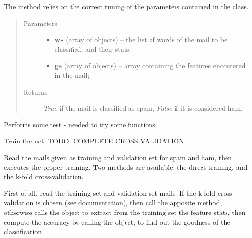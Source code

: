 \documentclass[letterpaper,10pt,english]{sphinxmanual}
\begin{document}
\begin{fulllineitems}
\begin{fulllineitems}
The method relies on the correct tuning of the parameters contained in
the {\hyperref[index:config.Config]{}} class.
\begin{quote}\begin{description}
\item[{Parameters}] \leavevmode\begin{itemize}
\item {} 
\textbf{ws} (array of {\hyperref[index:test_stat.Test_word]{}} objects) -- the list of words of the mail to be classified, and their stats;

\item {} 
\textbf{gs} (array of {\hyperref[index:test_stat.Test_stat]{}} objects) -- array containing the features encontered in the mail;

\end{itemize}

\item[{Returns}] \leavevmode
\emph{True} if the mail is classified as spam, \emph{False} if it is            considered ham.

\end{description}\end{quote}

\end{fulllineitems}


\begin{fulllineitems}
\label{index:naive_bayes.Bayes.test_bayes}
Performs some test - needed to try some functions.

\end{fulllineitems}


\begin{fulllineitems}
\label{index:naive_bayes.Bayes.train}
Train the net. TODO: COMPLETE CROSS-VALIDATION

Read the mails given as training and validation set for spam and ham,
then executes the proper training. Two methods are available: the direct
training, and the k-fold cross-validation.

First of all, read the training set and validation set mails.
If the k-fold cross-validation is chosen (see {\hyperref[index:config.Config]{}}
documentation), then call the apposite method, otherwise calls the
{\hyperref[index:trainer.Trainer]{}} object to extract from the training set
the feature stats, then compute the accuracy by calling the
{\hyperref[index:naive_bayes.Bayes.validate]{}} object, to find out the goodness of
the classification.


\end{fulllineitems}
\end{fulllineitems}
\end{document}
